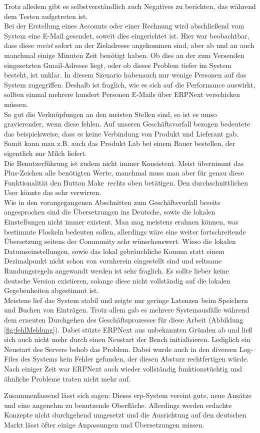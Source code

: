 Trotz alledem gibt es selbstverständlich auch Negatives zu berichten, das während dem Testen aufgetreten ist. \\
Bei der Erstellung eines Accounts oder einer Rechnung wird abschließend vom System eine E-Mail gesendet, soweit dies eingerichtet ist. Hier war beobachtbar, dass diese \emph{meist} sofort an der Zieladresse angekommen sind, aber ab und an auch manchmal einige Minuten Zeit benötigt haben. Ob dies an der zum Versenden eingesetzten Gmail-Adresse liegt, oder ob dieses Problem tiefer im System besteht, ist unklar. In diesem Szenario habenauch nur wenige Personen auf das System zugegriffen. Deshalb ist fraglich, wie es sich auf die Performance auswirkt, sollten einmal mehrere hundert Personen E-Mails über ERPNext verschicken müssen. \\
So gut die Verknüpfungen an den meisten Stellen sind, so ist es umso gravierender, wenn diese fehlen. Auf unseren Geschäftsvorfall bezogen bedeutete das beispielsweise, dass es keine Verbindung von Produkt und Lieferant gab. Somit kann man z.B. auch das Produkt Lab bei einem Bauer bestellen, der eigentlich nur Milch liefert. \\
Die Benutzerführung ist zudem nicht immer Konsistent. Meist übernimmt das Plus-Zeichen alle benötigten Werte, manchmal muss man aber für genau diese Funktionalität den Button \glqq Make\grqq\ rechts oben betätigen. Den durchschnittlichen User könnte das sehr verwirren. \\
Wie in den vorangegangenen Abschnitten zum Geschäftsvorfall bereits angesprochen sind die Übersetzungen ins Deutsche, sowie die lokalen Einstellungen nicht immer existent. Man mag meistens erahnen können, was bestimmte Floskeln bedeuten sollen, allerdings wäre eine weiter fortschreitende Übersetzung seitens der Community sehr wünschenswert. Wieso die lokalen Datumseinstellungen, sowie das lokal gebräuchliche Komma statt einem Dezimalpunkt nicht schon von vornherein eingestellt sind und seltsame Rundungsregeln angewandt werden ist sehr fraglich. Es sollte lieber keine deutsche Version existieren, solange diese nicht vollständig auf die lokalen Gegebenheiten abgestimmt ist. \\
Meistens lief das System stabil und zeigte nur geringe Latenzen beim Speichern und Buchen von Einträgen. Trotz allem gab es mehrere Systemausfälle während dem erneuten Durchgehen des Geschäftsprozesses für diese Arbeit (\vgl Abbildung \ref{fig:fehlMeldung}). Dabei stüzte ERPNext aus unbekannten Gründen ab und ließ sich auch nicht mehr durch einen Neustart der Bench initialisieren. Lediglich ein Neustart des Servers behob das Problem. Dabei wurde auch in den diversen Log-Files des Systems kein Fehler gefunden, der diesen Absturz rechtfertigen würde. Nach einiger Zeit war ERPNext auch wieder vollständig funktionstüchtig und ähnliche Probleme traten nicht mehr auf.

Zusammenfassend lässt sich sagen: Dieses \gls{erp}-System vereint gute, neue Ansätze und eine angenehm zu benutzende Oberfläche. Allerdings werden erdachte Konzepte nicht durchgehend umgesetzt und die Ausrichtung auf den deutschen Markt lässt öfter einige Anpassungen und Übersetzungen missen.